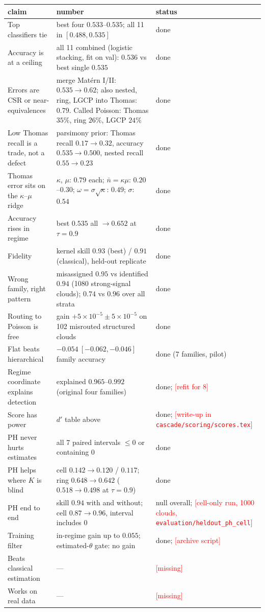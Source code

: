 \documentclass[11pt]{article}
\newcommand{\nb}{\bar n}
\newcommand{\pending}[1]{\textcolor{red}{[#1]}}
\newcommand{\src}[1]{{\footnotesize\texttt{#1}}}
\begin{document}
{\small
\begin{tabularx}{\linewidth}{@{}Xp{5.4cm}p{2.1cm}@{}}
\toprule
claim & number & status \\
\midrule
Top classifiers tie & best four $0.533$--$0.535$; all 11 in $[0.488,0.535]$ & done \\
Accuracy is at a ceiling & all 11 combined (logistic stacking, fit on val): $0.536$ vs best single $0.535$ & done \\
Errors are CSR or near-equivalences & merge Mat\'ern I/II: $0.535\to0.62$; also nested, ring, LGCP into Thomas: $0.79$.
  Called Poisson: Thomas $35\%$, ring $26\%$, LGCP $24\%$ & done \\
Low Thomas recall is a trade, not a defect & parsimony prior: Thomas recall $0.17\to0.32$, accuracy $0.535\to0.500$,
  nested recall $0.55\to0.23$ & done \\
Thomas error sits on the $\kappa$--$\mu$ ridge & $\kappa$, $\mu$: $0.79$ each; $\nb=\kappa\mu$: $0.20$--$0.30$;
  $\omega=\sigma\sqrt\kappa$: $0.49$; $\sigma$: $0.54$ & done \\
Accuracy rises in regime & best $0.535$ all $\to0.652$ at $\tau=0.9$ & done \\
Fidelity & kernel skill $0.93$ (best) / $0.91$ (classical), held-out replicate & done \\
Wrong family, right pattern & misassigned $0.95$ vs identified $0.94$ (1080 strong-signal clouds);
  $0.74$ vs $0.96$ over all strata & done \\
Routing to Poisson is free & gain $+5{\times}10^{-5}\pm5{\times}10^{-5}$ on 102 misrouted structured clouds & done \\
Flat beats hierarchical & $-0.054\ [-0.062,-0.046]$ family accuracy & done (7 families, pilot) \\
Regime coordinate explains detection & explained $0.965$--$0.992$ (original four families) & done; \pending{refit for 8} \\
Score has power & $d'$ table above & done; \pending{write-up in \src{cascade/scoring/scores.tex}} \\
PH never hurts estimates & all 7 paired intervals $\le0$ or containing $0$ & done \\
PH helps where $K$ is blind & cell $0.142\to0.120$ / $0.117$; ring $0.648\to0.642$ ($0.518\to0.498$ at $\tau=0.9$) & done \\
PH end to end & skill $0.94$ with and without; cell $0.87\to0.96$, interval includes $0$ & null overall;
  \pending{cell-only run, 1000 clouds, \src{evaluation/heldout\_ph\_cell}} \\
Training filter & in-regime gain up to $0.055$; estimated-$\theta$ gate: no gain & done; \pending{archive script} \\
Beats classical estimation & --- & \pending{missing} \\
Works on real data & --- & \pending{missing} \\
\bottomrule
\end{tabularx}
}
\end{document}
